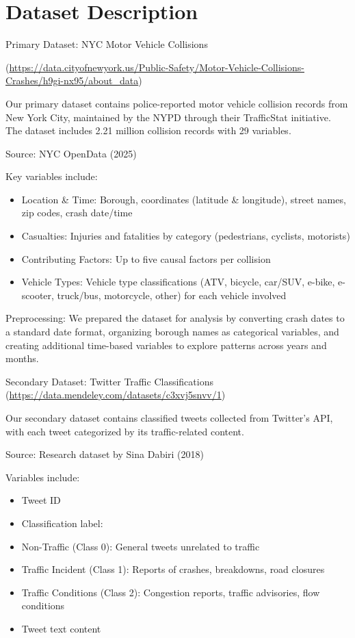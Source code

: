 \documentclass[10pt]{article}\usepackage[]{graphicx}\usepackage[]{xcolor}
\begin{document}
\section{Dataset Description}
Primary Dataset: NYC Motor Vehicle Collisions 

(\url{https://data.cityofnewyork.us/Public-Safety/Motor-Vehicle-Collisions-Crashes/h9gi-nx95/about_data})

Our primary dataset contains police-reported motor vehicle collision records from New York City, maintained by the NYPD through their TrafficStat initiative. The dataset includes 2.21 million collision records with 29 variables.


Source: NYC OpenData (2025)


Key variables include:
\begin{itemize}
  \item Location \& Time: Borough, coordinates (latitude \& longitude), street names, zip codes, crash date/time
  \item Casualties: Injuries and fatalities by category (pedestrians, cyclists, motorists)
  \item Contributing Factors: Up to five causal factors per collision
  \item Vehicle Types: Vehicle type classifications (ATV, bicycle, car/SUV, e-bike, e-scooter, truck/bus, motorcycle, other) for each vehicle involved
\end{itemize}


Preprocessing: We prepared the dataset for analysis by converting crash dates to a standard date format, organizing borough names as categorical variables, and creating additional time-based variables to explore patterns across years and months. 

Secondary Dataset: Twitter Traffic Classifications (\url{https://data.mendeley.com/datasets/c3xvj5snvv/1})

Our secondary dataset contains classified tweets collected from Twitter's API, with each tweet categorized by its traffic-related content.


Source: Research dataset by Sina Dabiri (2018)


Variables include:
\begin{itemize}
  \item Tweet ID
  \item Classification label: 
  \item Non-Traffic (Class 0): General tweets unrelated to traffic
  \item Traffic Incident (Class 1): Reports of crashes, breakdowns, road closures
  \item Traffic Conditions (Class 2): Congestion reports, traffic advisories, flow conditions
  \item Tweet text content
\end{itemize}
\end{document}

